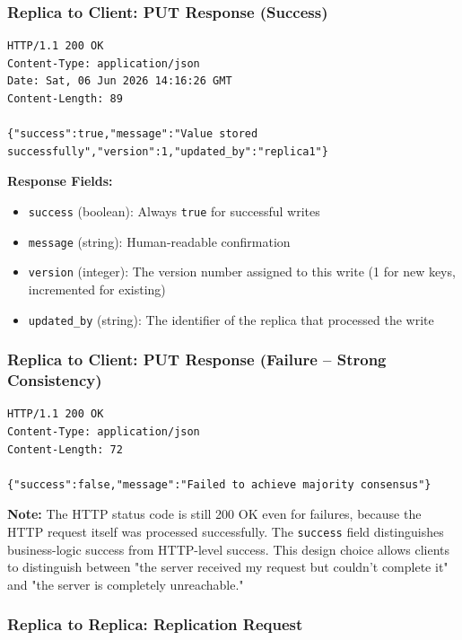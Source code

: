 \documentclass[10pt,a4paper]{article}
\begin{document}
\subsubsection{Replica to Client: PUT Response (Success)}

\begin{verbatim}
HTTP/1.1 200 OK
Content-Type: application/json
Date: Sat, 06 Jun 2026 14:16:26 GMT
Content-Length: 89

{"success":true,"message":"Value stored successfully","version":1,"updated_by":"replica1"}
\end{verbatim}

\textbf{Response Fields:}
\begin{itemize}
    \item \texttt{success} (boolean): Always \texttt{true} for successful writes
    \item \texttt{message} (string): Human-readable confirmation
    \item \texttt{version} (integer): The version number assigned to this write (1 for new keys, incremented for existing)
    \item \texttt{updated\_by} (string): The identifier of the replica that processed the write
\end{itemize}

\subsubsection{Replica to Client: PUT Response (Failure -- Strong Consistency)}

\begin{verbatim}
HTTP/1.1 200 OK
Content-Type: application/json
Content-Length: 72

{"success":false,"message":"Failed to achieve majority consensus"}
\end{verbatim}

\textbf{Note:} The HTTP status code is still 200 OK even for failures, because the HTTP request itself was processed successfully. The \texttt{success} field distinguishes business-logic success from HTTP-level success. This design choice allows clients to distinguish between "the server received my request but couldn't complete it" and "the server is completely unreachable."

\subsubsection{Replica to Replica: Replication Request}
\end{document}

